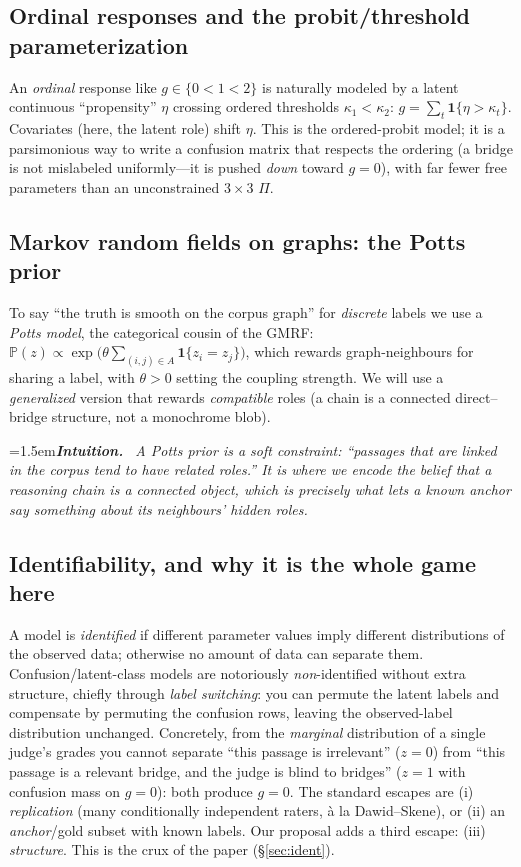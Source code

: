 \documentclass[11pt]{article}
\newenvironment{intuition}{\par\smallskip\noindent\hangindent=1.5em\textbf{\itshape Intuition.}\itshape\ \ignorespaces}{\par\smallskip}
\renewcommand{\Pr}{\mathbb{P}}
\begin{document}
\subsection{Ordinal responses and the probit/threshold parameterization}
An \emph{ordinal} response like $g\in\{0<1<2\}$ is naturally modeled by a latent continuous ``propensity''
$\eta$ crossing ordered thresholds $\kappa_1<\kappa_2$: $g=\sum_t\mathbf 1\{\eta>\kappa_t\}$. Covariates (here,
the latent role) shift $\eta$. This is the ordered-probit model; it is a parsimonious way to write a confusion
matrix that respects the ordering (a bridge is not mislabeled uniformly---it is pushed \emph{down} toward
$g{=}0$), with far fewer free parameters than an unconstrained $3\times3$ $\Pi$.

\subsection{Markov random fields on graphs: the Potts prior}
To say ``the truth is smooth on the corpus graph'' for \emph{discrete} labels we use a \emph{Potts model}, the
categorical cousin of the GMRF: $\Pr(z)\propto\exp\!\big(\theta\sum_{(i,j)\in A}\mathbf 1\{z_i\!=\!z_j\}\big)$,
which rewards graph-neighbours for sharing a label, with $\theta>0$ setting the coupling strength. We will use a
\emph{generalized} version that rewards \emph{compatible} roles (a chain is a connected direct--bridge
structure, not a monochrome blob).
\begin{intuition}
A Potts prior is a soft constraint: ``passages that are linked in the corpus tend to have related roles.'' It is
where we encode the belief that a reasoning chain is a \emph{connected} object, which is precisely what lets a
known anchor say something about its neighbours' hidden roles.
\end{intuition}

\subsection{Identifiability, and why it is the whole game here}\label{sec:idprelim}
A model is \emph{identified} if different parameter values imply different distributions of the observed data;
otherwise no amount of data can separate them. Confusion/latent-class models are notoriously \emph{non}-identified
without extra structure, chiefly through \emph{label switching}: you can permute the latent labels and
compensate by permuting the confusion rows, leaving the observed-label distribution unchanged. Concretely, from
the \emph{marginal} distribution of a single judge's grades you cannot separate ``this passage is irrelevant''
($z{=}0$) from ``this passage is a relevant bridge, and the judge is blind to bridges'' ($z{=}1$ with confusion
mass on $g{=}0$): both produce $g{=}0$. The standard escapes are (i) \emph{replication} (many conditionally
independent raters, à la Dawid--Skene), or (ii) an \emph{anchor}/gold subset with known labels. Our proposal
adds a third escape: (iii) \emph{structure}. This is the crux of the paper (\S\ref{sec:ident}).
\end{document}
